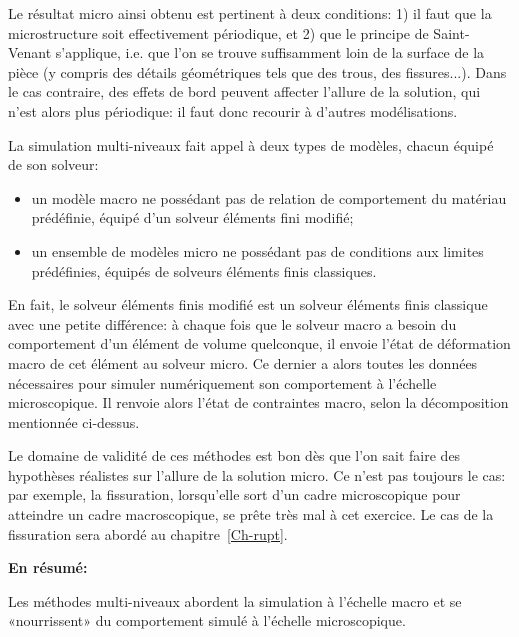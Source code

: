 Le résultat micro ainsi obtenu est pertinent à deux conditions: 1) il faut que la microstructure soit effectivement périodique, et 2) que le principe de Saint-Venant s'applique, i.e. que l'on se trouve suffisamment loin de la surface de la pièce (y compris des détails géométriques tels que des trous, des fissures...). Dans le cas contraire, des effets de bord peuvent affecter l'allure de la solution, qui n'est alors plus périodique: il faut donc recourir à d'autres modélisations.

\medskip
La simulation multi-niveaux fait appel à deux types de modèles, chacun équipé de son solveur:
\begin{itemize}
  \item un modèle macro ne possédant pas de relation de comportement du matériau prédéfinie, équipé d'un solveur éléments fini modifié;
  \item un ensemble de modèles micro ne possédant pas de conditions aux limites prédéfinies, équipés de solveurs éléments finis classiques.
\end{itemize}

En fait, le solveur éléments finis modifié est un solveur éléments finis classique avec une petite différence: à chaque fois que le solveur macro a besoin du comportement d'un élément de volume quelconque, il envoie l'état de déformation macro de cet élément au solveur micro. Ce dernier a alors toutes les données nécessaires pour simuler  numériquement son comportement à l'échelle microscopique. Il renvoie alors l'état de contraintes macro, selon la décomposition mentionnée ci-dessus.

Le domaine de validité de ces méthodes est bon dès que l'on sait faire des hypothèses réalistes sur l'allure de la solution micro. Ce n'est pas toujours le cas: par exemple, la fissuration, lorsqu'elle sort d'un cadre microscopique pour atteindre un cadre macroscopique, se prête très mal à cet exercice.
Le cas de la fissuration sera abordé au chapitre~\ref{Ch-rupt}.

\medskip{}
\textbf{En résumé:}

Les méthodes multi-niveaux abordent la simulation à l'échelle macro et se «nourrissent» du comportement simulé à l'échelle microscopique.

